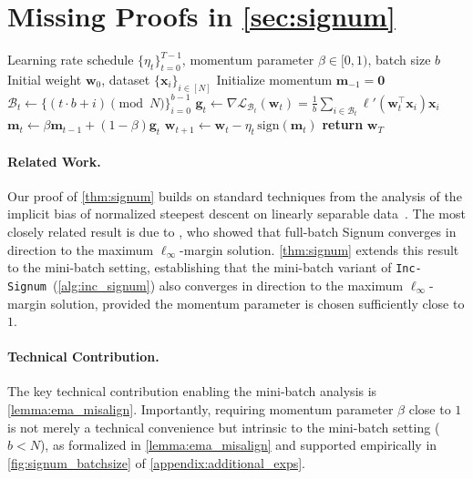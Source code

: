\documentclass{article} %
\theoremstyle{plain}
\theoremstyle{definition}
\theoremstyle{remark}
\def\gB{{\mathcal{B}}}
\newcommand{\Ls}{\mathcal{L}}
\def\bm{{\mathbf m}}
\def\bx{{\mathbf x}}
\def\bw{{\mathbf w}}
\def\bg{{\mathbf g}}
\begin{document}
\section[Missing Proofs in Section \ref{sec:signum}]{Missing Proofs in \cref{sec:signum}} \label{appendix:signum}

\begin{algorithm}[th]
\caption{\texttt{Inc-Signum}}\label{alg:inc_signum}
\begin{algorithmic}[1]
\renewcommand{\algorithmicrequire}{\textbf{Hyperparams:}}
\renewcommand{\algorithmicensure}{\textbf{Input:}}
\REQUIRE Learning rate schedule $\{\eta_t\}_{t=0}^{T-1}$, momentum parameter $\beta\in [0, 1)$, batch size $b$
\ENSURE Initial weight $\bw_0$, dataset $\{\bx_i\}_{i\in [N]}$
\STATE Initialize momentum $\bm_{-1} = \mathbf{0}$
    \STATE $\gB_t \leftarrow \{ (t \cdot b + i) \pmod N \}_{i=0}^{b-1}$ 
    \STATE $\bg_t \leftarrow \nabla \Ls_{\gB_t}(\bw_{t}) = \tfrac1b \sum_{i\in \gB_t} \ell'(\bw_t^\top \bx_i)\bx_i$ 
    \STATE $\bm_t \leftarrow \beta \bm_{t-1} + (1-\beta) \bg_{t}$ 
    \STATE $\bw_{t+1} \leftarrow \bw_{t} - \eta_t\, \mathrm{sign}(\bm_t)$
\ENDFOR
\STATE \textbf{return} $\bw_T$
\end{algorithmic}
\end{algorithm}

\paragraph{Related Work.}
Our proof of \cref{thm:signum} builds on standard techniques from the analysis of the implicit bias of normalized steepest descent on linearly separable data~\citep{gunasekar2018characterizing,zhang2024the,fan2025implicitbiasspectraldescent}. The most closely related result is due to \citet{fan2025implicitbiasspectraldescent}, who showed that full-batch Signum converges in direction to the maximum $\ell_\infty$-margin solution. \cref{thm:signum} extends this result to the mini-batch setting, establishing that the mini-batch variant of \texttt{Inc-Signum}~(\cref{alg:inc_signum}) also converges in direction to the maximum $\ell_\infty$-margin solution, provided the momentum parameter is chosen sufficiently close to $1$. 

\paragraph{Technical Contribution.}
The key technical contribution enabling the mini-batch analysis is \cref{lemma:ema_misalign}. Importantly, requiring momentum parameter $\beta$ close to $1$ is not merely a technical convenience but intrinsic to the mini-batch setting ($b < N$), as formalized in \cref{lemma:ema_misalign} and supported empirically in \cref{fig:signum_batchsize} of \cref{appendix:additional_exps}.
\end{document}
